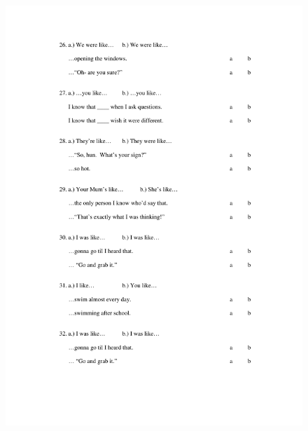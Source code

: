 \begin{figure}[htbp]
	\centering
		\includegraphics[width=5in]{images/Exp1page5.pdf}
		\label{x1p5}
\end{figure}

